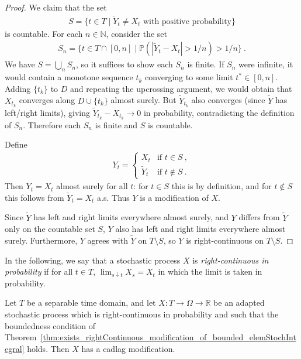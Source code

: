 \begin{proof}
  We claim that the set
  \begin{align*}
    S = \{t \in T \mid \tilde{Y}_t \ne X_t \text{ with positive probability}\}
  \end{align*}
  is countable.
  For each $n \in \mathbb{N}$, consider the set
  \begin{align*}
    S_n = \{t \in T \cap [0, n] \mid \mathbb{P}(|\tilde{Y}_t - X_t| > 1/n) > 1/n\}
    \:.
  \end{align*}
  We have $S = \bigcup_n S_n$, so it suffices to show each $S_n$ is finite.
  If $S_n$ were infinite, it would contain a monotone sequence $t_k$ converging to some limit
  $t^* \in [0, n]$. Adding $\{t_k\}$ to $D$ and repeating the upcrossing argument, we would obtain
  that $X_{t_k}$ converges along $D \cup \{t_k\}$ almost surely. But $\tilde{Y}_{t_k}$ also converges
  (since $\tilde{Y}$ has left/right limits), giving $\tilde{Y}_{t_k} - X_{t_k} \to 0$ in probability,
  contradicting the definition of $S_n$. Therefore each $S_n$ is finite and $S$ is countable.

  Define
  \begin{align*}
    Y_t = \begin{cases} X_t & \text{if } t \in S \:, \\ \tilde{Y}_t & \text{if } t \notin S \:. \end{cases}
  \end{align*}
  Then $Y_t = X_t$ almost surely for all $t$: for $t \in S$ this is by definition, and for
  $t \notin S$ this follows from $\tilde{Y}_t = X_t$ a.s. Thus $Y$ is a modification of $X$.

  Since $\tilde{Y}$ has left and right limits everywhere almost surely, and $Y$ differs from
  $\tilde{Y}$ only on the countable set $S$, $Y$ also has left and right limits everywhere almost surely.
  Furthermore, $Y$ agrees with $\tilde{Y}$ on $T \setminus S$, so $Y$ is right-continuous on $T \setminus S$.
\end{proof}

In the following, we say that a stochastic process $X$ is \emph{right-continuous in probability} if for all $t \in T$, $\lim_{s \downarrow t} X_s = X_t$ in which the limit is taken in probability.

\begin{corollary}\label{cor:exists_caldag_modification}
Let $T$ be a separable time domain, and let $X : T \to \Omega \to \mathbb{R}$ be an adapted stochastic process which is right-continuous in probability and such that the boundedness condition of Theorem~\ref{thm:exists_rightContinuous_modification_of_bounded_elemStochIntegral} holds.
Then $X$ has a cadlag modification.
\end{corollary}

